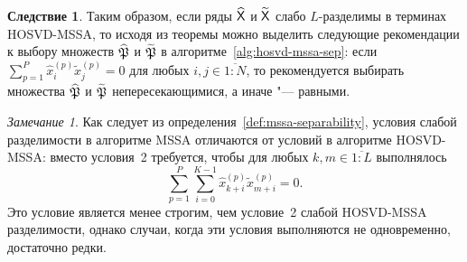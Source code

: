 \documentclass[specialist,
  substylefile=spbu.rtx,
subf,href,colorlinks=true, 12pt]{disser}
\theoremstyle{plain}
\theoremstyle{definition}
\newtheorem*{corollary}{Следствие}
\theoremstyle{remark}
\newtheorem*{remark}{Замечание}
\begin{document}
\begin{corollary}
  Таким образом, если ряды $\widehat{\mathsf{X}}$ и $\widetilde{\mathsf{X}}$ слабо $L$-разделимы
  в терминах HOSVD-MSSA, то исходя из теоремы можно выделить следующие рекомендации
  к выбору множеств $\widehat{\mathfrak{P}}$ и $\widetilde{\mathfrak{P}}$ в алгоритме~\ref{alg:hosvd-mssa-sep}:
  если $\sum_{p=1}^P \hat{x}_i^{(p)}\tilde{x}_j^{(p)} = 0$ для любых $i, j \in \overline{1:N}$,
  то рекомендуется выбирать множества $\widehat{\mathfrak{P}}$ и $\widetilde{\mathfrak{P}}$
  непересекающимися, а иначе "--- равными.
\end{corollary}

\begin{remark}
  Как следует из определения~\ref{def:mssa-separability}, условия слабой разделимости в алгоритме MSSA
  отличаются от условий в алгоритме HOSVD-MSSA: вместо условия~2 требуется, чтобы для любых
  $k, m \in \overline{1:L}$ выполнялось
  \[
    \sum_{p=1}^{P} \sum_{i=0}^{K-1} \hat{x}_{k+i}^{(p)} \tilde{x}_{m+i}^{(p)} = 0.
  \]
  Это условие является менее строгим, чем условие~2 слабой HOSVD-MSSA разделимости, однако случаи,
  когда эти условия выполняются не одновременно, достаточно редки.
\end{remark}
\end{document}
